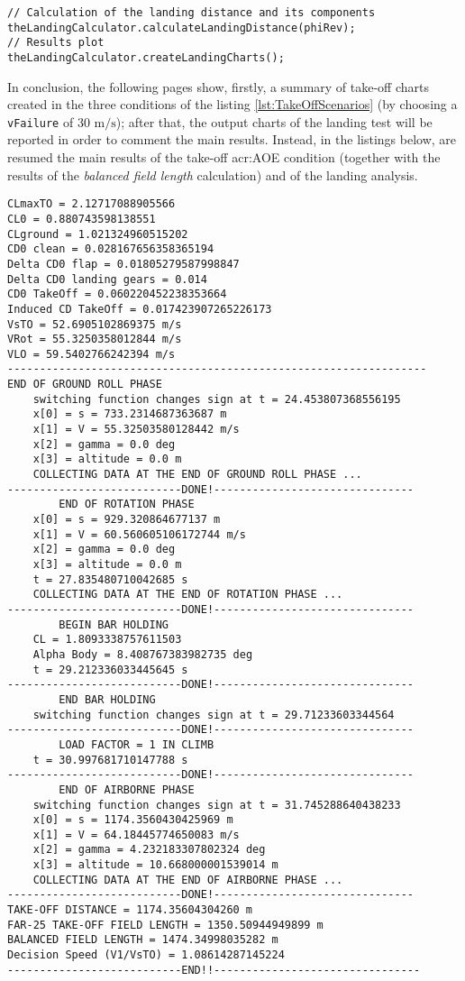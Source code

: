 \bigskip
\begin{lstlisting}[caption={Landing calculations and charts plot}, captionpos=b, tabsize=2]
// Calculation of the landing distance and its components
theLandingCalculator.calculateLandingDistance(phiRev);
// Results plot
theLandingCalculator.createLandingCharts();
\end{lstlisting}
%
In conclusion, the following pages show, firstly, a summary of take-off charts created in the three conditions of the listing \ref{lst:TakeOffScenarios} (by choosing a \lstinline[language=Java]!vFailure! of 30 $\si{\meter\per\second}$); after that, the output charts of the landing test will be reported in order to comment the main results. Instead, in the listings below, are resumed the main results of the take-off \gls{acr:AOE} condition (together with the results of the \emph{balanced field length} calculation) and of the landing analysis.

\bigskip
\begin{lstlisting}[caption={ATR-72 take-off test results}, captionpos=b, tabsize=2]
CLmaxTO = 2.12717088905566
CL0 = 0.880743598138551
CLground = 1.021324960515202
CD0 clean = 0.028167656358365194
Delta CD0 flap = 0.01805279587998847
Delta CD0 landing gears = 0.014
CD0 TakeOff = 0.060220452238353664
Induced CD TakeOff = 0.017423907265226173
VsTO = 52.6905102869375 m/s
VRot = 55.3250358012844 m/s
VLO = 59.5402766242394 m/s
-----------------------------------------------------------------
END OF GROUND ROLL PHASE
	switching function changes sign at t = 24.453807368556195
	x[0] = s = 733.2314687363687 m
	x[1] = V = 55.32503580128442 m/s
	x[2] = gamma = 0.0 deg
	x[3] = altitude = 0.0 m
	COLLECTING DATA AT THE END OF GROUND ROLL PHASE ...
---------------------------DONE!-------------------------------
		END OF ROTATION PHASE
	x[0] = s = 929.320864677137 m
	x[1] = V = 60.560605106172744 m/s
	x[2] = gamma = 0.0 deg
	x[3] = altitude = 0.0 m
	t = 27.835480710042685 s
	COLLECTING DATA AT THE END OF ROTATION PHASE ...
---------------------------DONE!-------------------------------
		BEGIN BAR HOLDING
	CL = 1.8093338757611503
	Alpha Body = 8.408767383982735 deg
	t = 29.212336033445645 s
---------------------------DONE!-------------------------------
		END BAR HOLDING
	switching function changes sign at t = 29.71233603344564
---------------------------DONE!-------------------------------
		LOAD FACTOR = 1 IN CLIMB
	t = 30.997681710147788 s
---------------------------DONE!-------------------------------
		END OF AIRBORNE PHASE
	switching function changes sign at t = 31.745288640438233
	x[0] = s = 1174.3560430425969 m
	x[1] = V = 64.18445774650083 m/s
	x[2] = gamma = 4.232183307802324 deg
	x[3] = altitude = 10.668000001539014 m
	COLLECTING DATA AT THE END OF AIRBORNE PHASE ...
---------------------------DONE!-------------------------------
TAKE-OFF DISTANCE = 1174.35604304260 m
FAR-25 TAKE-OFF FIELD LENGTH = 1350.50944949899 m
BALANCED FIELD LENGTH = 1474.34998035282 m
Decision Speed (V1/VsTO) = 1.08614287145224 
---------------------------END!!--------------------------------
\end{lstlisting}

